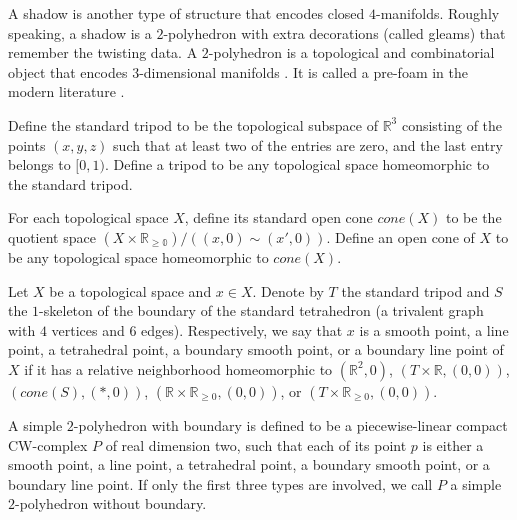 
\noindent A shadow is another type of structure that encodes
closed $4$-manifolds. Roughly speaking, a shadow is a
$2$-polyhedron with extra decorations (called gleams) that
remember the twisting data. A $2$-polyhedron is a topological and
combinatorial object that encodes $3$-dimensional manifolds
\cite{matveev/algorithmic-topology-and-classification-of-3-manifolds}.
It is called a pre-foam in the modern literature
\cite{khovanov-robert/foam}.

\begin{definition}[tripod]\label{def/tripod}
  Define the standard tripod to be the topological subspace of
  $\mathbb{R}^{3}$ consisting of the points $(x,y,z)$ such that
  at least two of the entries are zero, and the last entry
  belongs to $[0,1)$. Define a tripod to be any topological space
  homeomorphic to the standard tripod.
\end{definition}

\begin{definition}[cone]\label{def/cone}
  For each topological space $X$, define its standard open cone
  $cone(X)$ to be the quotient space
  $(X \times \mathbb{R_{\geq 0}})/((x,0) \sim (x',0)).$ Define an
  open cone of $X$ to be any topological space homeomorphic to
  $cone(X)$.
\end{definition}

\begin{definition}\label{def/local-shape}
  Let $X$ be a topological space and $x \in X$. Denote by $T$ the
  standard tripod and $S$ the $1$-skeleton of the boundary of the
  standard tetrahedron (a trivalent graph with $4$ vertices and
  $6$ edges). Respectively, we say that $x$ is a smooth point, a
  line point, a tetrahedral point, a boundary smooth point, or a
  boundary line point of $X$ if it has a relative neighborhood
  homeomorphic to $(\mathbb{R}^{2},0)$,
  $(T \times \mathbb{R}, (0, 0))$, $(cone(S), (*, 0))$,
  $(\mathbb{R} \times \mathbb{R}_{\geq 0}, (0, 0))$, or
  $(T \times \mathbb{R}_{\geq 0}, (0, 0))$.
\end{definition}

\begin{definition}\label{def/simple-2-polyhedron}
  A simple $2$-polyhedron with boundary is defined to be a
  piecewise-linear compact CW-complex $P$ of real dimension two,
  such that each of its point $p$ is either a smooth point, a
  line point, a tetrahedral point, a boundary smooth point, or a
  boundary line point. If only the first three types are
  involved, we call $P$ a simple $2$-polyhedron without boundary.
\end{definition}

